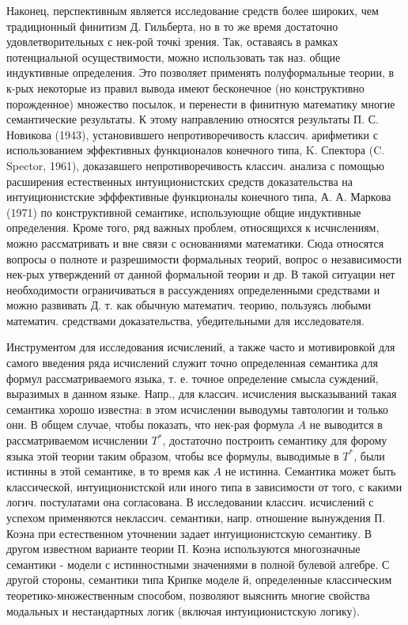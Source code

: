 \documentclass[10pt]{article}
\begin{document}
Наконец, перспективным является исследование средств более широких, чем традиционный финитизм Д. Гильберта, но в то же время достаточно удовлетворительных с нек-рой точкі зрения. Так, оставаясь в рамках потенциальной осуществимости, можно использовать так наз. общие индуктивные определения. Это позволяет применять полуформальные теории, в к-рых некоторые из правил вывода имеют бесконечное (но конструктивно порожденное) множество посылок, и перенести в финитную математику многие семантические результаты. К этому направлению относятся результаты П. С. Новикова (1943), установившего непротиворечивость классич. арифметики с использованием эффективных функционалов конечного типа, K. Спектора (C. Spector, 1961), доказавшего непротиворечивость классич. анализа с помощью расширения естественных интуиционистских средств доказательства на интуиционистские эфффективные функционалы конечного типа, А. А. Маркова (1971) по конструктивной семантике, использующие общие индуктивные определения. Кроме того, ряд важных проблем, относящихся к исчислениям, можно рассматривать и вне связи с основаниями математики. Сюда относятся вопросы о полноте и разрешимости формальных теорий, вопрос о независимости нек-рых утверждений от данной формальной теории и др. В такой ситуации нет необходимости ограничиваться в рассуждениях определенными средствами и можно развивать Д. т. как обычную математич. теорию, пользуясь любыми математич. средствами доказательства, убедительными для исследователя.



Инструментом для исследования исчислений, а также часто и мотивировкой для самого введения ряда исчислений служит точно определенная семантика для формул рассматриваемого языка, т. е. точное определение смысла суждений, выразимых в данном языке. Напр., для классич. исчисления высказываний такая семантика хорошо известна: в этом исчислении выводумы тавтологии и только они. В общем случае, чтобы показать, что нек-рая формула $A$ не выводится в рассматриваемом исчислении $T^{*}$, достаточно построить семантику для форому языка этой теории таким образом, чтобы все формулы, выводимые в $T^{*}$, были истинны в этой семантике, в то время как $A$ не истинна. Семантика может быть классической, интуиционистской или иного типа в зависимости от того, с какими логич. постулатами она согласована. В исследовании классич. исчислений с успехом применяются неклассич. семантики, напр. отношение вынуждения П. Коэна при естественном уточнении задает интуиционистскую семантику. В другом известном варианте теории П. Коэна используются многозначные семантики - модели с истинностными значениями в полной булевой алгебре. С другой стороны, семантики типа Крипке моделе й, определенные классическим теоретико-множественным способом, позволяют выяснить многие свойства модальных и нестандартных логик (включая интуиционистскую логику).
\end{document}
